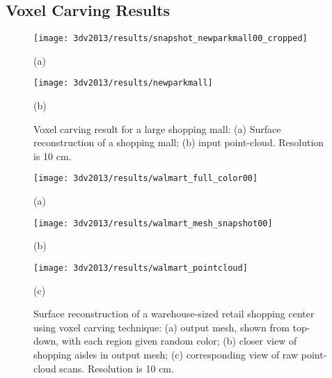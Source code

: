 \documentclass[12pt,onecolumn,oneside]{book}
\begin{document}
\FloatBarrier
\subsection{Voxel Carving Results}
\label{ssec:3dv2013_results}


\begin{figure}
	\begin{minipage}[t]{0.4\linewidth}
	\centerline{\texttt{[image: 3dv2013/results/snapshot\_newparkmall00\_cropped]}}
	\centerline{(a)}
	\end{minipage}
	\hfill
	\begin{minipage}[t]{0.55\linewidth}
	\centerline{\texttt{[image: 3dv2013/results/newparkmall]}}
	\centerline{(b)}
	\end{minipage}
	\caption[Voxel carving result for a large shopping mall.]{Voxel carving result for a large shopping mall:  (a) Surface reconstruction of a shopping mall; (b) input point-cloud.  Resolution is 10 cm.}
	\label{fig:3dv2013_newparkmall}
\end{figure}

\begin{figure}[p]
	\begin{minipage}[b]{0.98\linewidth}
	\centerline{\texttt{[image: 3dv2013/results/walmart\_full\_color00]}}
	\centerline{(a)}
	\end{minipage}
	\begin{minipage}[b]{0.48\linewidth}
	\centerline{\texttt{[image: 3dv2013/results/walmart\_mesh\_snapshot00]}}
	\centerline{(b)}
	\end{minipage}
	\hfill
	\begin{minipage}[b]{0.48\linewidth}
	\centerline{\texttt{[image: 3dv2013/results/walmart\_pointcloud]}}
	\centerline{(c)}
	\end{minipage}
	\caption[Voxel carving of warehouse-sized retail center.]{Surface reconstruction of a warehouse-sized retail shopping center using voxel carving technique: (a) output mesh, shown from top-down, with each region given random color; (b) closer view of shopping aisles in output mesh; (c) corresponding view of raw point-cloud scans.  Resolution is 10 cm.}
	\label{fig:3dv2013_walmart}
\end{figure}
\end{document}
